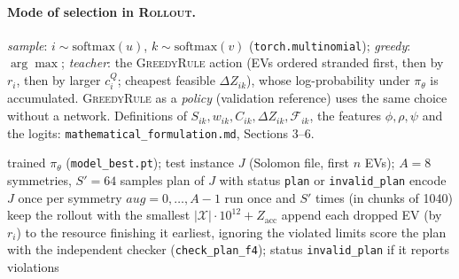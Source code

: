 \documentclass[10pt]{article}
\newcommand{\Fe}{\mathcal F}
\begin{document}
\paragraph{Mode of selection in \textsc{Rollout}.} \emph{sample}: $i\sim\mathrm{softmax}(u)$, $k\sim\mathrm{softmax}(v)$
(\texttt{torch.multinomial}); \emph{greedy}: $\arg\max$; \emph{teacher}: the \textsc{GreedyRule} action (EVs ordered
stranded first, then by $r_i$, then by larger $c^Q_i$; cheapest feasible $\Delta Z_{ik}$), whose log-probability under
$\pi_\theta$ is accumulated. \textsc{GreedyRule} as a \emph{policy} (validation reference) uses the same choice without
a network. Definitions of $S_{ik}, w_{ik}, C_{ik}, \Delta Z_{ik}, \Fe_{ik}$, the features $\phi,\rho,\psi$ and the
logits: \texttt{mathematical\_formulation.md}, Sections 3--6.

\begin{algorithm}[H]
\caption{RL Evaluation / inference (\texttt{solve\_rl\_f4.py}; no parameter update)}
\label{alg:rl-eval}
\begin{algorithmic}[1]
\Require trained $\pi_\theta$ (\texttt{model\_best.pt}); test instance $J$ (Solomon file, first $n$ EVs); $A{=}8$ symmetries, $S'{=}64$ samples
\Ensure plan of $J$ with status \texttt{plan} or \texttt{invalid\_plan}
\State encode $J$ once per symmetry $\textit{aug}=0,\dots,A-1$
  \State run  once and  $S'$ times (in chunks of 1040)
\EndFor
\State keep the rollout with the smallest $|\mathcal X|\cdot10^{12}+Z_{\text{acc}}$ 
 append each dropped EV (by $r_i$) to the resource finishing it earliest, ignoring the violated limits 
\EndIf
\State score the plan with the independent checker (\texttt{check\_plan\_f4}); status \texttt{invalid\_plan} if it reports violations
\end{algorithmic}
\end{algorithm}
\end{document}
